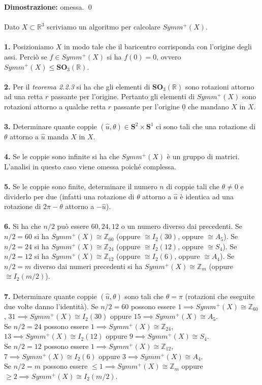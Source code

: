 \documentclass{article}
\begin{document}
\textbf{Dimostrazione:} omessa. \qed \\ \\
Dato $X \subset \mathbb{R}^3$ scriviamo un algoritmo per calcolare $Symm^+(X)$. \\ \\
\textbf{1.} Posizioniamo $X$ in modo tale che il baricentro corrisponda con l'origine degli assi. Perciò se $f \in Symm^+(X)$ si ha $f(0) = 0$, ovvero $Symm^+(X) \leq \mathbf{SO}_3(\mathbb{R})$. \\ \\
\textbf{2.} Per il \textit{teorema 2.2.3} si ha che gli elementi di $\mathbf{SO}_3(\mathbb{R})$ sono rotazioni attorno ad una retta $r$ passante per l'origine. Pertanto gli elementi di $Symm^+(X)$ sono rotazioni attorno a qualche retta $r$ passante per l'origine $\underline{0}$ che mandano $X$ in $X$. \\ \\
\textbf{3.} Determinare quante coppie $(\hat{u}, \theta) \in \mathbf{S}^2 \times \mathbf{S}^1$ ci sono tali che una rotazione di $\theta$ attorno a $\hat{u}$ manda $X$ in $X$. \\ \\
\textbf{4.} Se le coppie sono infinite si ha che $Symm^+(X)$ è un gruppo di matrici. L'analisi in questo caso viene omessa poiché complessa. \\ \\
\textbf{5.} Se le coppie sono finite, determinare il numero $n$ di coppie tali che $\theta \neq 0$ e dividerlo per due (infatti una rotazione di $\theta$ attorno a $\hat{u}$ è identica ad una rotazione di $2\pi - \theta$ attorno a $-\hat{u}$). \\ \\
\textbf{6.} Si ha che $n/2$ può essere $60, 24, 12$ o un numero diverso dai precedenti. Se $n/2 = 60$ si ha $Symm^+(X) \cong \mathbb{Z}_{60}$ (oppure $\cong I_2(30)$, oppure $\cong A_5$). Se $n/2 = 24$ si ha $Symm^+(X) \cong \mathbb{Z}_{24}$ (oppure $\cong I_2(12)$, oppure $\cong S_4$). Se $n/2 = 12$ si ha $Symm^+(X) \cong \mathbb{Z}_{12}$ (oppure $\cong I_2(6)$, oppure $\cong A_4$). Se $n/2 = m$ diverso dai numeri precedenti si ha $Symm^+(X) \cong \mathbb{Z}_m$ (oppure $\cong I_2(m/2)$). \\ \\
\textbf{7.} Determinare quante coppie $(\hat{u}, \theta)$ sono tali che $\theta = \pi$ (rotazioni che eseguite due volte danno l'identità). Se $n/2 = 60$ possono essere $1 \implies Symm^+(X) \cong \mathbb{Z}_{60}$, $31 \implies Symm^+(X) \cong I_2(30)$ oppure $15 \implies Symm^+(X) \cong A_5$. \\
Se $n/2 = 24$ possono essere $1 \implies Symm^+(X) \cong \mathbb{Z}_{24}$, $13 \implies Symm^+(X) \cong I_2(12)$ oppure $9 \implies Symm^+(X) \cong S_4$. \\
Se $n/2 = 12$ possono essere $1 \implies Symm^+(X) \cong \mathbb{Z}_{12}$, $7 \implies Symm^+(X) \cong I_2(6)$ oppure $3 \implies Symm^+(X) \cong A_4$. \\
Se $n/2 = m$ possono essere $\leq 1 \implies Symm^+(X) \cong \mathbb{Z}_m$ oppure $\geq 2 \implies Symm^+(X) \cong I_2(m/2)$.
\end{document}
